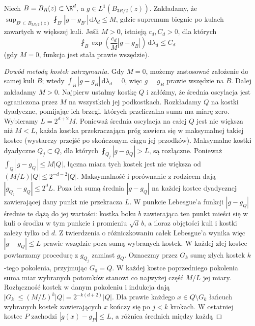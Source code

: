 \begin{lemat}
\label{lem:pde17-jn}
Niech $B=B_R(z)\subset\R^d$, a
$g\in L^1(B_{3R/2}(z))$. Zakładamy, że
$\sup_{B'\subset B_{3R/2}(z)}\fint_{B'}
|g-g_{B'}|\,\mathrm d\lambda_d\le M$,
gdzie supremum biegnie po kulach zawartych w większej kuli.
Jeśli $M>0$, istnieją $c_d,C_d>0$, dla których
\begin{equation}\label{eq:pde17-jn}
 \fint_B\exp\left(\frac{c_d}{M}|g-g_B|\right)
 \,\mathrm d\lambda_d\le C_d
\end{equation}
(gdy $M=0$, funkcja jest stała prawie wszędzie).
\end{lemat}
\begin{proof}[Dowód metodą kostek zatrzymania]
Gdy $M=0$, możemy zastosować założenie do samej kuli $B$;
wtedy $\int_B|g-g_B|\,\mathrm d\lambda_d=0$, więc $g=g_B$
prawie wszędzie na $B$. Dalej zakładamy $M>0$.
Najpierw ustalmy kostkę $Q$ i załóżmy, że średnia oscylacja
jest ograniczona przez $M$ na wszystkich jej podkostkach.
Rozkładamy $Q$ na kostki dyadyczne, pomijając ich brzegi,
których przeliczalna suma ma miarę zero.
Wybieramy $L=2^{d+2}M$. Ponieważ średnia oscylacja
na całej $Q$ jest nie większa niż $M<L$, każda kostka
przekraczająca próg zawiera się w maksymalnej takiej
kostce (wystarczy przejść po skończonym ciągu jej przodków).
Maksymalne kostki dyadyczne
$Q_j\subset Q$, dla których
$\fint_{Q_j}|g-g_Q|>L$, są rozłączne. Ponieważ
$\int_Q|g-g_Q|\le M|Q|$, łączna miara tych kostek
jest nie większa od $(M/L)|Q|\le 2^{-d-2}|Q|$.
Maksymalność i porównanie z rodzicem dają
$|g_{Q_j}-g_Q|\le2^dL$. Poza ich sumą średnia $|g-g_Q|$ na każdej kostce
dyadycznej zawierającej dany punkt nie przekracza $L$.
W punkcie Lebesgue'a funkcji $|g-g_Q|$ średnie te dążą
do jej wartości: kostka boku $b$ zawierająca ten punkt
mieści się w kuli o środku w tym punkcie i promieniu
$\sqrt d\,b$, a iloraz objętości kuli i kostki zależy
tylko od $d$. Z twierdzenia o różniczkowaniu całek
Lebesgue'a wynika więc $|g-g_Q|\le L$ prawie wszędzie
poza sumą wybranych kostek. W każdej złej kostce powtarzamy procedurę
z $g_{Q_j}$ zamiast $g_Q$. Oznaczmy przez $G_k$ sumę
złych kostek $k$-tego pokolenia, przyjmując $G_0=Q$.
W każdej kostce poprzedniego pokolenia suma miar
wybranych potomków stanowi co najwyżej część $M/L$
jej miary. Rozłączność kostek w danym pokoleniu i indukcja
dają $|G_k|\le (M/L)^k|Q|=2^{-k(d+2)}|Q|$.
Dla prawie każdego $x\in Q\setminus G_k$ łańcuch
wybranych kostek zawierających $x$ kończy się
po $j<k$ krokach. W ostatniej kostce $P$ zachodzi
$|g(x)-g_P|\le L$, a różnica średnich między każdą

\end{proof}
